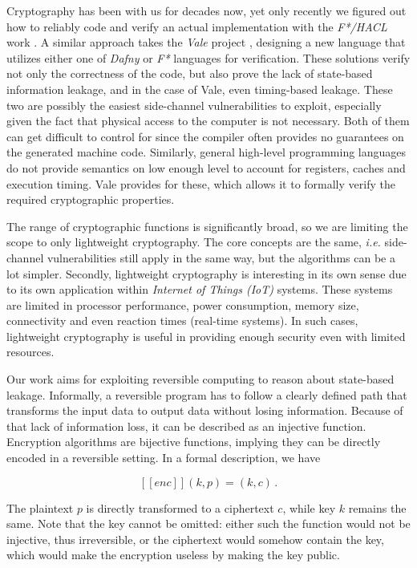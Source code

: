 \documentclass[a4paper,10pt,openright]{memoir}
\newcommand{\ie}{\emph{i.e.}\xspace}
\def\enc{\ensuremath{\mathit{enc}}}
\newcommand{\exe}[1]{\ensuremath{[\![#1]\!]}}
\newcommand{\term}[1]{\textit{#1}}
\begin{document}

Cryptography has been with us for decades now, yet only 
recently we figured out how to reliably code and verify an 
actual implementation with the \term{F*/HACL} work \cite{ProtzenkoEtal:2017}. 
A similar approach takes the \term{Vale} project \cite{BondEtal:2017:Vale}, 
designing a new language that utilizes either one of \term{Dafny} or \term{F*} languages for 
verification. These solutions verify not only the correctness of the 
code, but also prove the lack of state-based information leakage, and 
in the case of Vale, even timing-based leakage. These two are possibly 
the easiest side-channel vulnerabilities to exploit, especially given 
the fact that physical access to the computer is not necessary. Both of 
them can get difficult to control for since the compiler often provides 
no guarantees on the generated machine code. Similarly, general high-level programming 
languages do not provide semantics on low enough level to account for 
registers, caches and execution timing. Vale provides for these, which 
allows it to formally verify the required cryptographic properties.

The range of cryptographic functions is significantly broad, so we are 
limiting the scope to only lightweight cryptography. The core concepts 
are the same, \ie side-channel vulnerabilities still apply in the same 
way, but the algorithms can be a lot simpler. Secondly, lightweight 
cryptography is interesting in its own sense due to its own application 
within \term{Internet of Things (IoT)} systems. These systems are 
limited in processor performance, power consumption, memory size, 
connectivity and even reaction times (real-time systems). In such 
cases, lightweight cryptography is useful in providing enough security 
even with limited resources.

Our work aims for exploiting reversible computing to reason about 
state-based leakage. Informally, a reversible program has to follow a 
clearly defined path that transforms the input data to output data 
without losing information. Because of that lack of information loss, 
it can be described as an injective function. Encryption algorithms are 
bijective functions, implying they can be directly encoded in a 
reversible setting. In a formal description, we have

$$
\exe{\enc}(k,p) = (k,c) \,.
$$

The plaintext $p$ is directly transformed to a ciphertext $c$, while 
key $k$ remains the same. Note that the key cannot be omitted: either 
such the function would not be injective, thus irreversible, or the 
ciphertext would somehow contain the key, which would make the 
encryption useless by making the key public. 
\end{document}
